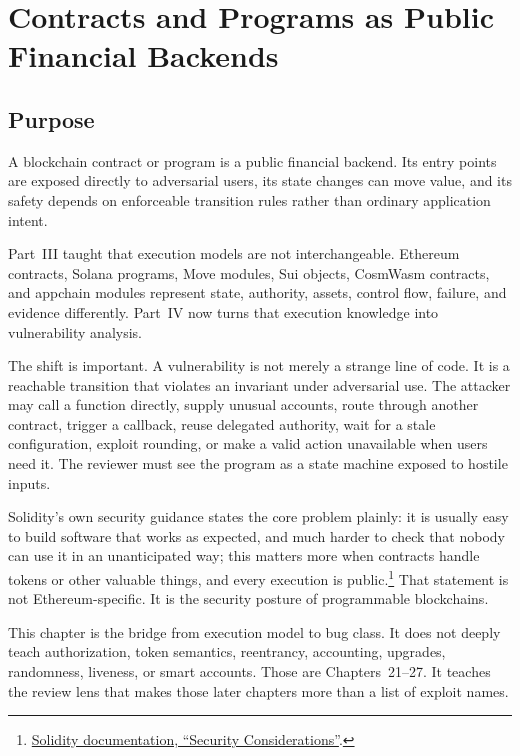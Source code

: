 \chapter{Contracts and Programs as Public Financial Backends}

\section{Purpose}

\begin{principlebox}
A blockchain contract or program is a public financial backend. Its entry points are exposed directly to adversarial users, its state changes can move value, and its safety depends on enforceable transition rules rather than ordinary application intent.
\end{principlebox}

Part~III taught that execution models are not interchangeable. Ethereum contracts, Solana programs, Move modules, Sui objects, CosmWasm contracts, and appchain modules represent state, authority, assets, control flow, failure, and evidence differently. Part~IV now turns that execution knowledge into vulnerability analysis.

The shift is important. A vulnerability is not merely a strange line of code. It is a reachable transition that violates an invariant under adversarial use. The attacker may call a function directly, supply unusual accounts, route through another contract, trigger a callback, reuse delegated authority, wait for a stale configuration, exploit rounding, or make a valid action unavailable when users need it. The reviewer must see the program as a state machine exposed to hostile inputs.

Solidity's own security guidance states the core problem plainly: it is usually easy to build software that works as expected, and much harder to check that nobody can use it in an unanticipated way; this matters more when contracts handle tokens or other valuable things, and every execution is public.\footnote{\href{https://docs.soliditylang.org/en/latest/security-considerations.html}{Solidity documentation, ``Security Considerations''}.} That statement is not Ethereum-specific. It is the security posture of programmable blockchains.

This chapter is the bridge from execution model to bug class. It does not deeply teach authorization, token semantics, reentrancy, accounting, upgrades, randomness, liveness, or smart accounts. Those are Chapters~21--27. It teaches the review lens that makes those later chapters more than a list of exploit names.


